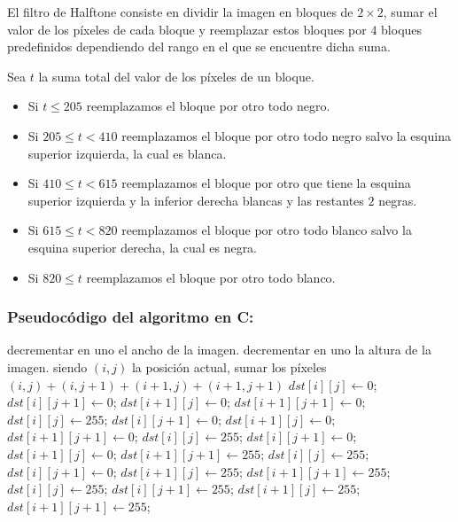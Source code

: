 El filtro de Halftone consiste en dividir la imagen en bloques de $2 \times 2$, sumar el valor de los píxeles de cada bloque y reemplazar estos bloques por $4$ bloques predefinidos dependiendo del rango en el que se encuentre dicha suma. 

Sea $t$ la suma total del valor de los píxeles de un bloque.

\begin{itemize}
\item Si $t \leq 205$ reemplazamos el bloque por otro todo negro.
\item Si $205 \leq t < 410$ reemplazamos el bloque por otro todo negro salvo la esquina superior izquierda, la cual es blanca.
\item Si $410 \leq t < 615$ reemplazamos el bloque por otro que tiene la esquina superior izquierda y la inferior derecha blancas y las restantes $2$ negras.
\item Si $615 \leq t < 820$ reemplazamos el bloque por otro todo blanco salvo la esquina superior derecha, la cual es negra.
\item Si $820 \leq t$ reemplazamos el bloque por otro todo blanco.
\end{itemize}


\subsubsection{Pseudocódigo del algoritmo en C:}

\begin{pseudocodigo}
    \STATE decrementar en uno el ancho de la imagen.
  \ENDIF
    \STATE decrementar en uno la altura de la imagen.
  \ENDIF
      \STATE siendo $(i,j)$ la posición actual, sumar los píxeles $(i,j) + (i,j+1) + (i+1,j) + (i+1,j+1)$
        \STATE $dst[i][j]     \leftarrow 0$;
        \STATE $dst[i][j+1]   \leftarrow 0$;
        \STATE $dst[i+1][j]   \leftarrow 0$;
        \STATE $dst[i+1][j+1] \leftarrow 0$;
      \ELSE
          \STATE $dst[i][j]     \leftarrow 255$;
          \STATE $dst[i][j+1]   \leftarrow 0$;
          \STATE $dst[i+1][j]   \leftarrow 0$;
          \STATE $dst[i+1][j+1] \leftarrow 0$;
        \ELSE
            \STATE $dst[i][j]     \leftarrow 255$;
            \STATE $dst[i][j+1]   \leftarrow 0$;
            \STATE $dst[i+1][j]   \leftarrow 0$;
            \STATE $dst[i+1][j+1] \leftarrow 255$;
          \ELSE
              \STATE $dst[i][j]     \leftarrow 255$;
              \STATE $dst[i][j+1]   \leftarrow 0$;
              \STATE $dst[i+1][j]   \leftarrow 255$;
              \STATE $dst[i+1][j+1] \leftarrow 255$;
            \ELSE 
              \STATE $dst[i][j]     \leftarrow 255$;
              \STATE $dst[i][j+1]   \leftarrow 255$;
              \STATE $dst[i+1][j]   \leftarrow 255$;
              \STATE $dst[i+1][j+1] \leftarrow 255$;
            \ENDIF
          \ENDIF
        \ENDIF
      \ENDIF
    \ENDFOR
  \ENDFOR
\end{pseudocodigo}


